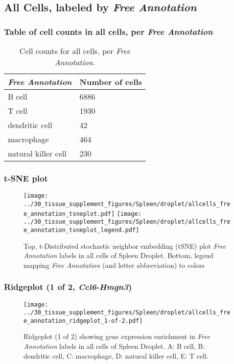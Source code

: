 \clearpage

\subsection{All Cells, labeled by \emph{Free Annotation}}
\subsubsection{Table of cell counts in all cells, per \emph{Free Annotation}}\begin{table}[h]
\centering
\label{my-label}
\begin{tabular}{@{}ll@{}}
\toprule

\emph{Free Annotation}& Number of cells \\ \midrule
B cell & 6886 \\

T cell & 1930 \\

dendritic cell & 42 \\

macrophage & 464 \\

natural killer cell & 230 \\
\bottomrule
\end{tabular}
\caption{Cell counts for all cells, per \emph{Free Annotation}.}
\end{table}

\clearpage
\subsubsection{t-SNE plot}
\begin{figure}[h]
\centering
\texttt{[image: ../30\_tissue\_supplement\_figures/Spleen/droplet/allcells\_free\_annotation\_tsneplot.pdf]}
\texttt{[image: ../30\_tissue\_supplement\_figures/Spleen/droplet/allcells\_free\_annotation\_tsneplot\_legend.pdf]}
\caption{Top, t-Distributed stochastic neighbor embedding (tSNE) plot  \emph{Free Annotation} labels in all cells of Spleen Droplet. Bottom, legend mapping \emph{Free Annotation} (and letter abbreviation) to colors}
\end{figure}


\clearpage

\subsubsection{Ridgeplot (1 of 2, \emph{Ccl6}-\emph{Hmgn3})}
\begin{figure}[h]
\centering
\texttt{[image: ../30\_tissue\_supplement\_figures/Spleen/droplet/allcells\_free\_annotation\_ridgeplot\_1-of-2.pdf]}

\caption{ Ridgeplot (1 of 2)  showing gene expression enrichment in \emph{Free Annotation} labels in all cells of Spleen Droplet. A: B cell, B: dendritic cell, C: macrophage, D: natural killer cell, E: T cell.}
\end{figure}


